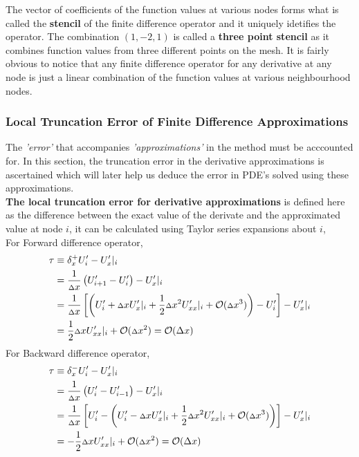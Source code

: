 The vector of coefficients of the function values at various nodes forms what is called the \textbf{stencil} of the finite difference operator and it uniquely idetifies the operator. The combination $(1,-2,1)$ is called a \textbf{three point stencil} as it combines function values from three different points on the mesh.
It is fairly obvious to notice that any finite difference operator for any derivative at any node is just a linear combination of the function values at various neighbourhood nodes.   

\subsubsection{Local Truncation Error of Finite Difference Approximations}
The \textit{'error'} that accompanies \textit{'approximations'} in the method must be acccounted for. In this section, the truncation error in the derivative approximations is ascertained which will later help us deduce the error in PDE's solved using these approximations.
\\[2mm]
\textbf{The local truncation error for derivative approximations} is defined here as the difference between the exact value of the derivate and the approximated value at node $i$, it can be calculated using Taylor series expansions about $i$,\\[2mm]
For Forward difference operator, 
\begin{align*}
    \tau &\equiv \delta _ x^{+} U'_ i - {U'_ x}|_ i \\
    &= \frac{1}{{\scriptstyle \Delta} x}\left( U'_ {i+1} - U'_{i}\right) - {U'_ x}|_i \\
    &= \frac{1}{{\scriptstyle \Delta} x}\left[ \left( U'_ i + {\scriptstyle \Delta} x{U'_ x}|_ i + \frac{1}{2}{\scriptstyle \Delta} x^2{U'_{xx}}|_ i + \mathcal{O}({\scriptstyle \Delta} x^3)\right) - U'_i \right] - {U'_ x}|_ i \\
    &= \frac{1}{2}{\scriptstyle \Delta} x{U'_{xx}}|_ i + \mathcal{O}({\scriptstyle \Delta} x^2) = \mathcal{O}(\Delta x)
\end{align*}
For Backward difference operator, 
\begin{align*}
    \tau &\equiv \delta _ x^{-} U'_ i - {U'_ x}|_ i \\
    &= \frac{1}{{\scriptstyle \Delta} x}\left( U'_ i - U'_{i-1}\right) - {U'_ x}|_i \\
    &= \frac{1}{{\scriptstyle \Delta} x}\left[ U'_ i - \left( U'_ i - {\scriptstyle \Delta} x{U'_ x}|_ i + \frac{1}{2}{\scriptstyle \Delta} x^2{U'_{xx}}|_ i + \mathcal{O}({\scriptstyle \Delta} x^3)\right)\right] - {U'_ x}|_ i \\
    &= -\frac{1}{2}{\scriptstyle \Delta} x{U'_{xx}}|_ i + \mathcal{O}({\scriptstyle \Delta} x^2) = \mathcal{O}(\Delta x)  
\end{align*}
